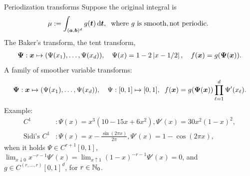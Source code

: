 \documentclass[handout, 10pt,compress,xcolor={usenames,dvipsnames}]{beamer} %
\newcommand{\bm}[1]{\boldsymbol{#1}}
\newcommand{\vPsi}{\bm{ \Psi}}
\newcommand{\pause}{}
\def\abs#1{\ensuremath{\left \lvert #1 \right \rvert}}
\begin{document}
\begin{frame}{Periodization transforms}
\vspace*{-5ex}
Suppose the original integral is \vspace*{-1ex}
\begin{equation*}
\mu := \int_{(\boldsymbol{a},\boldsymbol{b})^d} g(\boldsymbol{t}) \, {\rm d} \boldsymbol{t}, \hspace{0.2cm}
\text{where $g$ is smooth}, \text{not periodic. }
\end{equation*}
The Baker's transform, the tent transform, \vspace*{-1ex}
\begin{align*} %
\vPsi: \vx \mapsto (\Psi(x_1),  \ldots, \Psi(x_d)),  \quad \Psi(x)  =1 - 2 \abs{x - 1/2}, \quad f(\vx) = g(\vPsi(\vx)).
\end{align*} \pause
A family of smoother variable transforms: \vspace*{-3ex}
\begin{align*}
\vPsi: \vx \mapsto (\Psi(x_1),  \ldots, \Psi(x_d)), \quad \Psi:[0,1] \mapsto [0,1], \hspace{0.2cm}
f(\vx) = g(\vPsi(\vx)) \prod_{\ell = 1}^d \Psi'(x_\ell).
\end{align*}
Example: \vspace*{-2ex}
\begin{align*}
C^1 & : \Psi(x) = x^3(10-15x+6x^2), \Psi'(x) = 30x^2(1-x)^2, \\
\text{Sidi's } C^1 & : \Psi(x) = x - \frac{\sin(2\pi x)}{2 \pi}, \Psi'(x) = 1 - \cos(2\pi x),
\end{align*}
when it holds
$\Psi \in C^{r+1}[0,1]$,
$\lim_{x \downarrow 0}x^{-r-1}\Psi'(x) = \lim_{x \uparrow 1} (1-x)^{-r-1}\Psi'(x) = 0$, and 
$g \in C^{(r, \ldots, r)}[0,1]^d$, for $r \in \mathbb{N}_{0}$.
\end{frame}
\end{document}
